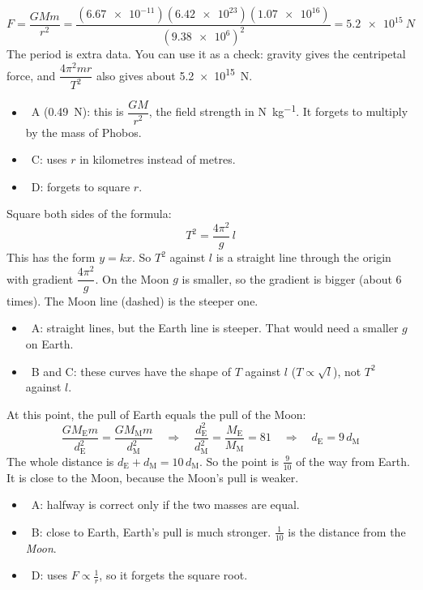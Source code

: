 \begin{practiceanswers}
\begin{practiceans}
  \[ F = \frac{GMm}{r^2}
       = \frac{(\num{6.67e-11})(\num{6.42e23})(\num{1.07e16})}{(\num{9.38e6})^2}
       = \qty{5.2e15}{N} \]
  The period is extra data. You can use it as a check: gravity gives the centripetal force, and
  $\dfrac{4\pi^2 m r}{T^2}$ also gives about \qty{5.2e15}{N}.
  \begin{itemize}
    \item \xmark\ A (\qty{0.49}{N}): this is $\dfrac{GM}{r^2}$, the field strength in
          \si{N.kg^{-1}}. It forgets to multiply by the mass of Phobos.
    \item \xmark\ C: uses $r$ in kilometres instead of metres.
    \item \xmark\ D: forgets to square $r$.
  \end{itemize}
\end{practiceans}

\begin{practiceans}
  Square both sides of the formula:
  \[ T^2 = \frac{4\pi^2}{g}\, l \]
  This has the form $y = kx$. So $T^2$ against $l$ is a straight line through the origin with
  gradient $\dfrac{4\pi^2}{g}$. On the Moon $g$ is smaller, so the gradient is bigger (about 6
  times). The Moon line (dashed) is the steeper one.
  \begin{itemize}
    \item \xmark\ A: straight lines, but the Earth line is steeper. That would need a smaller $g$ on
          Earth.
    \item \xmark\ B and C: these curves have the shape of $T$ against $l$ ($T \propto \sqrt{l}$),
          not $T^2$ against $l$.
  \end{itemize}
\end{practiceans}

\begin{practiceans}
  At this point, the pull of Earth equals the pull of the Moon:
  \[ \frac{GM_\mathrm{E}m}{d_\mathrm{E}^2} = \frac{GM_\mathrm{M}m}{d_\mathrm{M}^2}
     \quad\Rightarrow\quad \frac{d_\mathrm{E}^2}{d_\mathrm{M}^2} = \frac{M_\mathrm{E}}{M_\mathrm{M}} = 81
     \quad\Rightarrow\quad d_\mathrm{E} = 9\,d_\mathrm{M} \]
  The whole distance is $d_\mathrm{E} + d_\mathrm{M} = 10\,d_\mathrm{M}$. So the point is
  $\frac{9}{10}$ of the way from Earth. It is close to the Moon, because the Moon's pull is weaker.
  \begin{itemize}
    \item \xmark\ A: halfway is correct only if the two masses are equal.
    \item \xmark\ B: close to Earth, Earth's pull is much stronger. $\frac{1}{10}$ is the distance
          from the \emph{Moon}.
    \item \xmark\ D: uses $F \propto \frac{1}{r}$, so it forgets the square root.
  \end{itemize}
\end{practiceans}


\end{practiceanswers}
